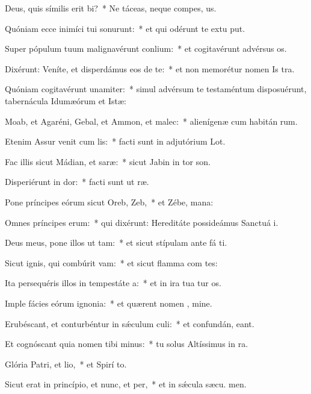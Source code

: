 \item Deus, quis símilis erit bi?~* Ne táceas, neque compes, us.
\item Quóniam ecce inimíci tui sonurunt:~* et qui odérunt te extu put.
\item Super pópulum tuum malignavérunt conlium:~* et cogitavérunt advérsus  os.
\item Dixérunt: Veníte, et disperdámus eos de te:~* et non memorétur nomen Is tra.
\item Quóniam cogitavérunt unamiter:~* simul advérsum te testaméntum disposuérunt, tabernácula Idumæórum et Istæ:
\item Moab, et Agaréni, Gebal, et Ammon, et malec:~* alienígenæ cum habitán rum.
\item Etenim Assur venit cum lis:~* facti sunt in adjutórium  Lot.
\item Fac illis sicut Mádian, et saræ:~* sicut Jabin in tor son.
\item Disperiérunt in dor:~* facti sunt ut  ræ.
\item Pone príncipes eórum sicut Oreb,  Zeb,~* et Zébe,  mana:
\item Omnes príncipes erum:~* qui dixérunt: Hereditáte possideámus Sanctuá i.
\item Deus meus, pone illos ut tam:~* et sicut stípulam ante fá ti.
\item Sicut ignis, qui combúrit vam:~* et sicut flamma com tes:
\item Ita persequéris illos in tempestáte a:~* et in ira tua tur os.
\item Imple fácies eórum ignonia:~* et quærent nomen , mine.
\item Erubéscant, et conturbéntur in sǽculum culi:~* et confundán,  eant.
\item Et cognóscant quia nomen tibi minus:~* tu solus Altíssimus in  ra.
\item Glória Patri, et lio,~* et Spirí to.
\item Sicut erat in princípio, et nunc, et per,~* et in sǽcula sæcu. men.
